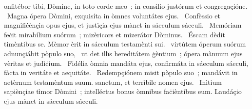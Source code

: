 \psalmChapterWithInscription{}
{ }
{%
onfitébor tìbi, Dòmine, in toto corde meo~; in consìlio justórum et congregaçióne. 
~Magna ópera Dòmini, exquisíta in òmnes voluntátes ejus. 
~Confèssio et magnifiċènçia opus ejus, et justìçia ejus mànet in sáeculum sáeculi. 
~Memóriam feċit mirabílium suórum~; mizèricors et mizerátor Dòminus. 
~Éscam dèdit timèntibus se. Mèmor èrit in sáeculum testamènti sui. 
~virtútem óperum suórum adnunçiábit pòpulo suo, 
~ut det illïs hereditátem ġèntium~; ópera mànuum ejus vèritas et judìċium. 
~Fidélia òmnia mandáta ejus, confirmáta in sáeculum sáeculi, fàcta in veritáte et aequitáte. 
~Redempçiónem misit pòpulo suo~; mandávit in aetèrnum testamèntum suum. sanctum, et terrìbile nomen ejus. 
~Inìtium sapiènçiae tìmor Dòmini~; intelléctus bonus òmnibus faċièntibus eum. Laudáçio ejus mànet in sáeculum sáeculi. 
}
